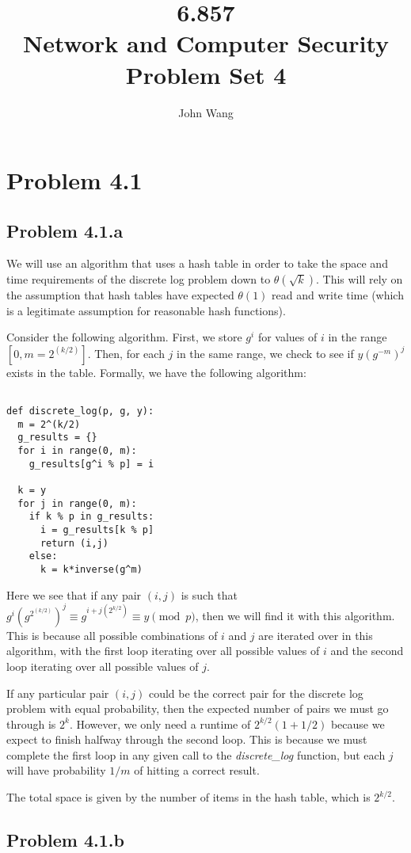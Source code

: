\documentclass[psamsfonts]{amsart}
\title{6.857 \\
Network and Computer Security \\
Problem Set 4}
\author{John Wang}
\begin{document}
\maketitle

\section*{Problem 4.1}

\subsection*{Problem 4.1.a}

We will use an algorithm that uses a hash table in order to take the space and time requirements of the discrete log problem down to $\theta(\sqrt{k})$. This will rely on the assumption that hash tables have expected $\theta(1)$ read and write time (which is a legitimate assumption for reasonable hash functions).

Consider the following algorithm. First, we store $g^i$ for values of $i$ in the range $[0, m = 2^(k/2)]$. Then, for each $j$ in the same range, we check to see if $y (g^{-m})^j$ exists in the table. Formally, we have the following algorithm:

\begin{verbatim}

def discrete_log(p, g, y):
  m = 2^(k/2)
  g_results = {}
  for i in range(0, m):
    g_results[g^i % p] = i

  k = y
  for j in range(0, m):
    if k % p in g_results:
      i = g_results[k % p]
      return (i,j)
    else:
      k = k*inverse(g^m)
\end{verbatim}

Here we see that if any pair $(i,j)$ is such that $g^i (g^{2^(k/2)})^j \equiv g^{i + j (2^{k/2})} \equiv y \pmod{p}$, then we will find it with this algorithm. This is because all possible combinations of $i$ and $j$ are iterated over in this algorithm, with the first loop iterating over all possible values of $i$ and the second loop iterating over all possible values of $j$.

If any particular pair $(i,j)$ could be the correct pair for the discrete log problem with equal probability, then the expected number of pairs we must go through is $2^k$. However, we only need a runtime of $2^{k/2} (1 + 1/2)$ because we expect to finish halfway through the second loop. This is because we must complete the first loop in any given call to the \emph{discrete\_log} function, but each $j$ will have probability $1/m$ of hitting a correct result.

The total space is given by the number of items in the hash table, which is $2^{k/2}$.

\subsection{Problem 4.1.b}
\end{document}
